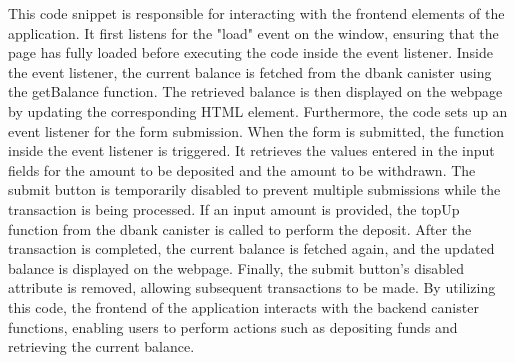 This code snippet is responsible for interacting with the frontend elements of the application. It first listens for the "load" event on the window, ensuring that the page has fully loaded before executing the code inside the event listener. Inside the event listener, the current balance is fetched from the dbank canister using the getBalance function. The retrieved balance is then displayed on the webpage by updating the corresponding HTML element. Furthermore, the code sets up an event listener for the form submission. When the form is submitted, the function inside the event listener is triggered. It retrieves the values entered in the input fields for the amount to be deposited and the amount to be withdrawn. The submit button is temporarily disabled to prevent multiple submissions while the transaction is being processed. If an input amount is provided, the topUp function from the dbank canister is called to perform the deposit. After the transaction is completed, the current balance is fetched again, and the updated balance is displayed on the webpage. Finally, the submit button's disabled attribute is removed, allowing subsequent transactions to be made. By utilizing this code, the frontend of the application interacts with the backend canister functions, enabling users to perform actions such as depositing funds and retrieving the current balance.